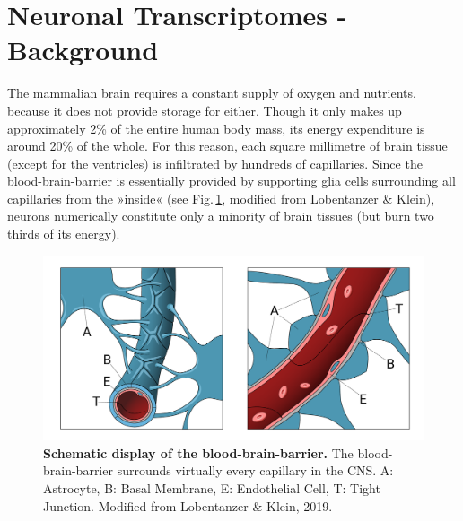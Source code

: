 \section{Neuronal Transcriptomes - Background}
The mammalian brain requires a constant supply of oxygen and nutrients, because it does not provide storage for either. Though it only makes up approximately 2\% of the entire human body mass, its energy expenditure is around 20\% of the whole.\cite{Raichle2002} For this reason, each square millimetre of brain tissue (except for the ventricles) is infiltrated by hundreds of capillaries.\cite{Bohn2016} Since the blood-brain-barrier is essentially provided by supporting glia cells surrounding all capillaries from the »inside« (see Fig.\,\ref{fig:bbb}, modified from Lobentanzer \& Klein\cite{Lobentanzer2019b}), neurons numerically constitute only a minority of brain tissues (but burn two thirds of its energy).

\begin{figure}
\includegraphics[width=\textwidth]{figures/bbb}
\caption[The blood-brain-barrier.]{\textbf{Schematic display of the blood-brain-barrier.} The blood-brain-barrier surrounds virtually every capillary in the CNS. A: Astrocyte, B: Basal Membrane, E: Endothelial Cell, T: Tight Junction. Modified from Lobentanzer \& Klein, 2019.\cite{Lobentanzer2019b}
\label{fig:bbb}}
\end{figure}

